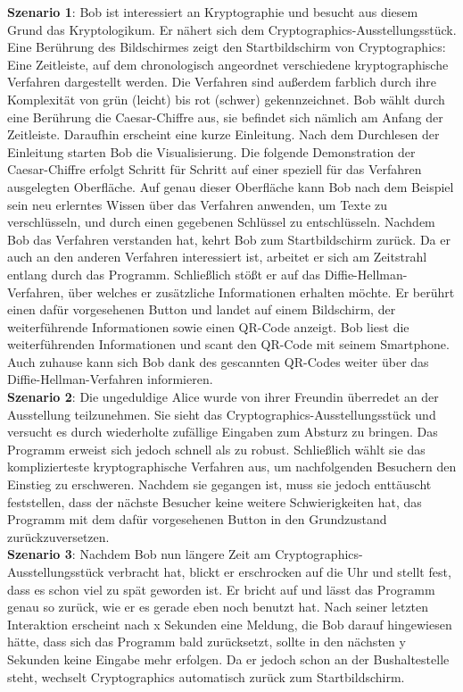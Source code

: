 \documentclass{article}
\begin{document}
\textbf{Szenario 1}:
Bob ist interessiert an Kryptographie und besucht aus diesem Grund das \gls{Kryptologikum}. Er nähert sich dem \gls{Cryptographics}-Ausstellungsstück. Eine Berührung des Bildschirmes zeigt den Startbildschirm von \gls{Cryptographics}: Eine Zeitleiste, auf dem chronologisch angeordnet verschiedene kryptographische Verfahren dargestellt werden. Die Verfahren sind außerdem farblich durch ihre Komplexität von grün (leicht) bis rot (schwer) gekennzeichnet. Bob wählt durch eine Berührung die Caesar-Chiffre aus, sie befindet sich nämlich am Anfang der Zeitleiste. Daraufhin erscheint eine kurze Einleitung. Nach dem Durchlesen der Einleitung starten Bob die Visualisierung. Die folgende Demonstration der Caesar-Chiffre erfolgt Schritt für 
Schritt auf 
einer speziell für das Verfahren ausgelegten Oberfläche. Auf genau dieser Oberfläche kann Bob nach dem Beispiel sein neu erlerntes Wissen über das Verfahren anwenden, um Texte zu verschlüsseln, und durch einen gegebenen Schlüssel zu entschlüsseln. Nachdem Bob das Verfahren verstanden hat, kehrt Bob zum Startbildschirm zurück. Da er auch an den anderen Verfahren interessiert ist, arbeitet er sich am Zeitstrahl entlang durch das Programm. Schließlich stößt er auf das Diffie-Hellman-Verfahren, über welches er zusätzliche Informationen erhalten möchte. Er berührt einen dafür vorgesehenen Button und landet auf einem Bildschirm, der weiterführende Informationen sowie einen QR-Code anzeigt. Bob liest die weiterführenden Informationen und scant den QR-Code mit seinem Smartphone. Auch zuhause kann sich Bob dank des gescannten QR-Codes weiter über das Diffie-Hellman-Verfahren informieren.\\

\textbf{Szenario 2}:
Die ungeduldige Alice wurde von ihrer Freundin überredet an der Ausstellung teilzunehmen. Sie sieht das \gls{Cryptographics}-Ausstellungsstück und versucht es durch wiederholte zufällige Eingaben zum Absturz zu bringen. Das Programm erweist sich jedoch schnell als zu robust. Schließlich wählt sie das komplizierteste kryptographische Verfahren aus, um nachfolgenden Besuchern den Einstieg zu erschweren. Nachdem sie gegangen ist, muss sie jedoch enttäuscht feststellen, dass der nächste Besucher keine weitere Schwierigkeiten hat, das Programm mit dem dafür vorgesehenen Button in den Grundzustand zurückzuversetzen.\\

\textbf{Szenario 3}:
Nachdem Bob nun längere Zeit am \gls{Cryptographics}-Ausstellungsstück verbracht hat, blickt er erschrocken auf die Uhr und stellt fest, dass es schon viel zu spät geworden ist. Er bricht auf und lässt das Programm genau so zurück, wie er es gerade eben noch benutzt hat. Nach seiner letzten Interaktion erscheint nach x Sekunden eine Meldung, die Bob darauf hingewiesen hätte, dass sich das Programm bald zurücksetzt, sollte in den nächsten y Sekunden keine Eingabe mehr erfolgen. Da er jedoch schon an der Bushaltestelle steht, wechselt \gls{Cryptographics} automatisch zurück zum Startbildschirm.\\
\end{document}

